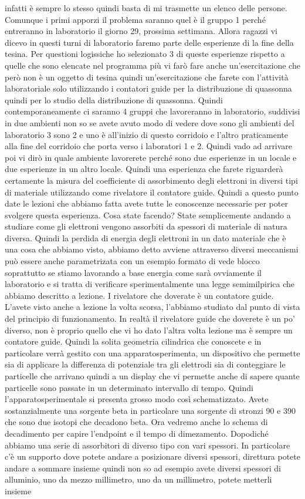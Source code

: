 infatti è sempre lo stesso quindi basta di mi trasmette un elenco delle persone. Comunque i primi apporzi il problema saranno quel è il gruppo 1 perché entreranno in laboratorio il giorno 29, prossima settimana. Allora ragazzi vi dicevo in questi turni di laboratorio faremo parte delle esperienze di la fine della tesina. Per questioni logissiche ho selezionato 3 di queste esperienze rispetto a quelle che sono elencate nel programma più vi farò fare anche un'esercitazione che però non è un oggetto di tesina quindi un'esercitazione che farete con l'attività laboratoriale solo utilizzando i contatori guide per la distribuzione di quassonna quindi per lo studio della distribuzione di quassonna. Quindi contemporaneamente ci saranno 4 gruppi che lavoreranno in laboratorio, suddivisi in due ambienti non so se avete avuto modo di vedere dove sono gli ambienti del laboratorio 3 sono 2 e uno è all'inizio di questo corridoio e l'altro praticamente alla fine del corridoio che porta verso i laboratori 1 e 2. Quindi vado ad arrivare poi vi dirò in quale ambiente lavorerete perché sono due esperienze in un locale e due esperienze in un altro locale. Quindi una esperienza che farete riguarderà certamente la misura del coefficiente di assorbimento degli elettroni in diversi tipi di materiale utilizzando come rivelatore il contatore guide. Quindi a questo punto date le lezioni che abbiamo fatta avete tutte le conoscenze necessarie per poter svolgere questa esperienza. Cosa state facendo? State semplicemente andando a studiare come gli elettroni vengono assorbiti da spessori di materiale di natura diversa. Quindi la perdida di energia degli elettroni in un dato materiale che è una cosa che abbiamo visto, abbiamo detto avviene attraverso diversi meccanismi può essere anche parametrizata con un esempio formato di vede blocco soprattutto se stiamo lavorando a base energia come sarà ovviamente il laboratorio e si tratta di verificare sperimentalmente una legge semimilpirica che abbiamo descritto a lezione. I rivelatore che doverate è un contatore guide. L'avete visto anche a lezione la volta scorsa, l'abbiamo studiato dal punto di vista del principio di funzionamento. In realtà il rivelatore guide che doverete è un po' diverso, non è proprio quello che vi ho dato l'altra volta lezione ma è sempre un contatore guide. Quindi la solita geometria cilindrica che conoscete e in particolare verrà gestito con una apparatosperimenta, un dispositivo che permette sia di applicare la differenza di potenziale tra gli elettrodi sia di conteggiare le particelle che arrivano quindi a un display che vi permette anche di sapere quante particelle sono passate in un determinato intervallo di tempo. Quindi l'apparatosperimentale si presenta grosso modo così schematizzato. Avete sostanzialmente una sorgente beta in particolare una sorgente di stronzi 90 e 390 che sono due isotopi che decadono beta. Ora vedremo anche lo schema di decadimento per capire l'endpoint e il tempo di dimezamento. Dopodiché abbiamo una serie di assorbitori di diverso tipo con vari spessori. In particolare c'è un supporto dove potete andare a posizionare diversi spessori, direttura potete andare a sommare insieme quindi non so ad esempio avete diversi spessori di alluminio, uno da mezzo millimetro, uno da un millimetro, potete metterli insieme 